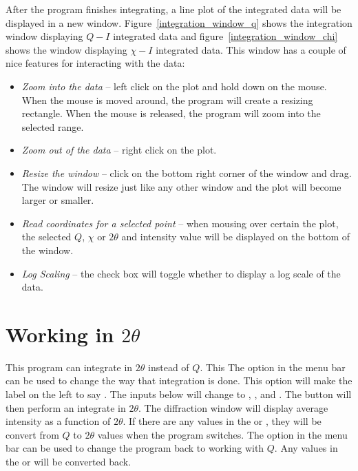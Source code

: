 After the program finishes integrating, a line plot
of the integrated data will be displayed in a new window. 
Figure~\ref{integration_window_q} shows 
the integration window displaying $Q-I$ integrated data
and figure~\ref{integration_window_chi} shows the
window displaying $\chi-I$ integrated data.
This window has a couple of nice features for interacting
with the data:
\begin{itemize}
    \item {\em Zoom into the data} -- left click on the plot and 
    hold down on the mouse. When the mouse is moved around, the
    program will create a resizing rectangle.  When the mouse is 
    released, the program will zoom into the selected range.
    \item {\em Zoom out of the data} -- right
    click on the plot.
    \item {\em Resize the window} -- click on the bottom right 
    corner of the window and drag. The window will resize just 
    like any other window and the plot will become larger or 
    smaller.  
    \item {\em Read coordinates for a selected point} --
    when mousing over certain the plot, the selected $Q$, $\chi$
    or $2\theta$ and intensity value will be displayed on
    the bottom of the window.
    \item {\em Log Scaling} -- the  check box
    will toggle whether to display a log scale of the data.
\end{itemize}

\section{\texorpdfstring{Working in $2\theta$}{Working in 2theta}}

This program can integrate in $2\theta$ instead of $Q$. This
The  option in the menu bar can be used
to change the way that integration is done. This option will
make the label on the left to say 
. The inputs below will 
change to , , 
and . The 
 button will then perform an integrate 
in $2\theta$. The diffraction window will display
average intensity as a function of $2\theta$.
If there are any values in the  or
, they will be convert from $Q$ to $2\theta$
values when the program switches. The  option
in the menu bar can be used to change the program 
back to working with $Q$. Any values in the 
or  will be converted back.

